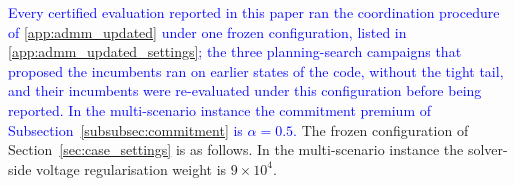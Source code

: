 \textcolor{blue}{
    Every certified evaluation reported in this paper ran the coordination procedure of \ref{app:admm_updated} under one frozen configuration, listed in \ref{app:admm_updated_settings}; the three planning-search campaigns that proposed the incumbents ran on earlier states of the code, without the tight tail, and their incumbents were re-evaluated under this configuration before being reported. In the multi-scenario instance the commitment premium of Subsection~\ref{subsubsec:commitment} is $\alpha = 0.5$.
}
\label{app:admm_updated_settings}
    The frozen configuration of Section~\ref{sec:case_settings} is as follows.
    In the multi-scenario instance the solver-side voltage regularisation weight is $9 \times 10^{4}$.

